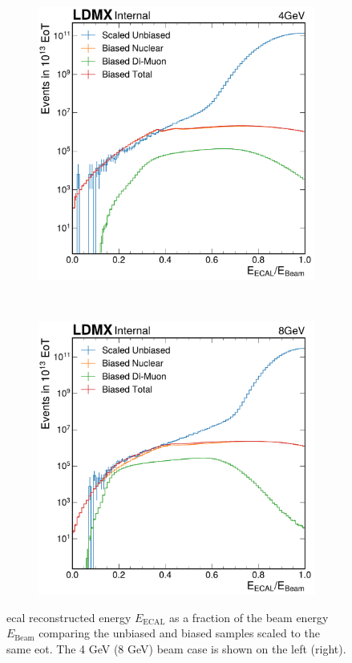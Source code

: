 \begin{figure}
  \centering
  \begin{subfigure}{0.48\textwidth}
    \includegraphics[width=\textwidth]{figures/ldmx/simulation/unbiased-biased-comp-4gev.pdf}
  \end{subfigure}
  ~
  \begin{subfigure}{0.48\textwidth}
    \includegraphics[width=\textwidth]{figures/ldmx/simulation/unbiased-biased-comp-8gev.pdf}
  \end{subfigure}
  \caption{\ac{ecal} reconstructed energy $E_\text{ECAL}$ as a fraction of the beam energy
  $E_\text{Beam}$ comparing the unbiased and biased samples scaled to the same \ac{eot}.
  The 4 GeV (8 GeV) beam case is shown on the left (right).}
  \label{fig:unbiased-biased-comp}
\end{figure}

